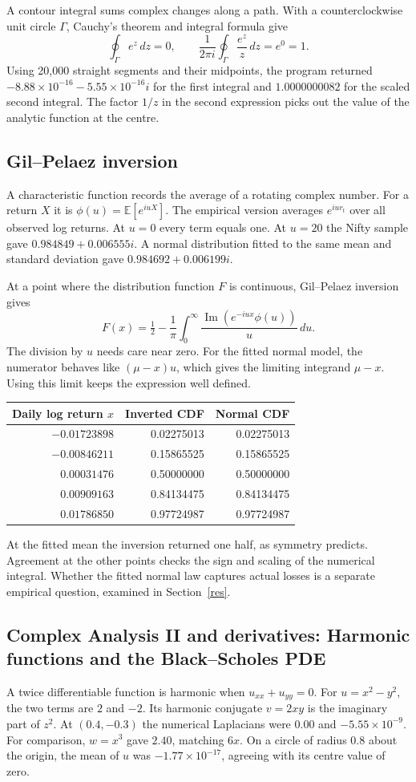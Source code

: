 \documentclass[12pt,a4paper]{article}
\newcommand{\topic}[1]{\clearpage\subsection{#1}}
\begin{document}
A contour integral sums complex changes along a path. With a counterclockwise unit circle $\Gamma$, Cauchy's theorem and integral formula give
\[
 \oint_\Gamma e^z\,dz=0,\qquad
 \frac{1}{2\pi i}\oint_\Gamma\frac{e^z}{z}\,dz=e^0=1 .
\]
Using 20,000 straight segments and their midpoints, the program returned $-8.88\times10^{-16}-5.55\times10^{-16}i$ for the first integral and $1.0000000082$ for the scaled second integral. The factor $1/z$ in the second expression picks out the value of the analytic function at the centre.
\topic{Gil--Pelaez inversion}
A characteristic function records the average of a rotating complex number. For a return $X$ it is $\phi(u)=\mathbb E[e^{iuX}]$. The empirical version averages $e^{iu r_t}$ over all observed log returns. At $u=0$ every term equals one. At $u=20$ the Nifty sample gave $0.984849+0.006555i$. A normal distribution fitted to the same mean and standard deviation gave $0.984692+0.006199i$.
 
At a point where the distribution function $F$ is continuous, Gil--Pelaez inversion gives \cite{gil}
\[
 F(x)=\tfrac12-\frac1\pi\int_0^\infty
 \frac{\operatorname{Im}\!\left(e^{-iux}\phi(u)\right)}{u}\,du .
\]
The division by $u$ needs care near zero. For the fitted normal model, the numerator behaves like $(\mu-x)u$, which gives the limiting integrand $\mu-x$. Using this limit keeps the expression well defined.
\begin{center}\begin{tabular}{rrr}\toprule
Daily log return $x$ & Inverted CDF & Normal CDF\\\midrule
$-0.01723898$&0.02275013&0.02275013\\
$-0.00846211$&0.15865525&0.15865525\\
$0.00031476$&0.50000000&0.50000000\\
$0.00909163$&0.84134475&0.84134475\\
$0.01786850$&0.97724987&0.97724987\\\bottomrule\end{tabular}\par\nopagebreak{}\end{center}
At the fitted mean the inversion returned one half, as symmetry predicts. Agreement at the other points checks the sign and scaling of the numerical integral. Whether the fitted normal law captures actual losses is a separate empirical question, examined in Section~\ref{res}.
\topic{Complex Analysis II and derivatives: Harmonic functions and the Black--Scholes PDE}
A twice differentiable function is harmonic when $u_{xx}+u_{yy}=0$. For $u=x^2-y^2$, the two terms are $2$ and $-2$. Its harmonic conjugate $v=2xy$ is the imaginary part of $z^2$. At $(0.4,-0.3)$ the numerical Laplacians were $0.00$ and $-5.55\times10^{-9}$. For comparison, $w=x^3$ gave $2.40$, matching $6x$. On a circle of radius $0.8$ about the origin, the mean of $u$ was $-1.77\times10^{-17}$, agreeing with its centre value of zero.
 
\end{document}
